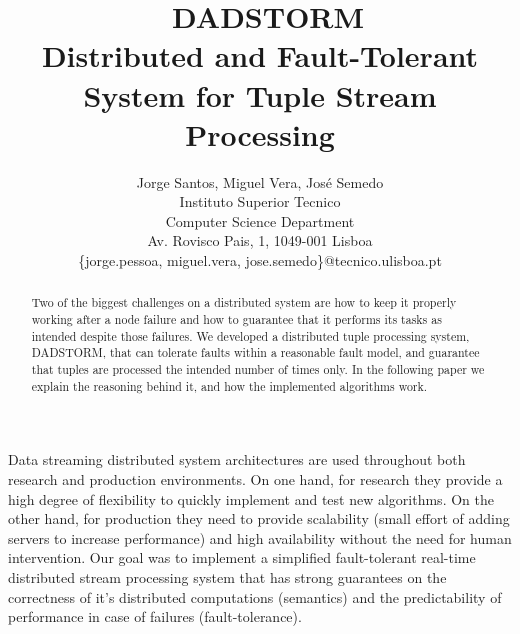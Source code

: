 \documentclass[times, 10pt,twocolumn]{article}
\begin{document}
\title{\ DADSTORM\\ Distributed and Fault-Tolerant System for Tuple
Stream Processing}

			 \author{Jorge Santos, Miguel Vera, Jos\'e Semedo \\
				 Instituto Superior Tecnico\\ Computer Science
				 Department\\ Av. Rovisco Pais, 1,
				 1049-001 Lisboa\\ \{jorge.pessoa, miguel.vera,
				 jose.semedo\}@tecnico.ulisboa.pt }

\maketitle \thispagestyle{empty}

\begin{abstract} Two of the biggest challenges on a distributed
   system are how to keep it properly working after a node failure
   and how to guarantee that it performs its tasks as intended despite
   those failures. We developed a distributed tuple processing
   system, DADSTORM, that can tolerate faults within a reasonable 
   fault model, and guarantee that tuples are processed the intended
   number of times only. In the following paper we explain
   the reasoning behind it, and how the implemented algorithms work.
 \end{abstract}


	Data streaming distributed system architectures are used 
throughout both research and production environments. On one
hand, for research they provide a high degree of flexibility to 
quickly implement and test new algorithms. On the other
hand, for production they need to provide scalability (small effort 
of adding servers to increase performance) and high availability 
without the need for human intervention. Our goal was to implement
a simplified fault-tolerant real-time distributed stream processing 
system that has strong guarantees on the correctness of 
it's distributed computations (semantics) and the predictability of performance 
in case of failures (fault-tolerance).
\end{document}
